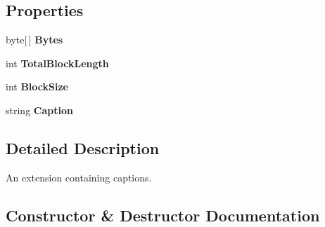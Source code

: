 \subsection*{Properties}
\begin{DoxyCompactItemize}
\item 
byte\mbox{[}$\,$\mbox{]} {\bfseries Bytes}\hypertarget{classvcvj_1_1_models_1_1_grammatical___subcomponents_1_1_plain_text_extension_a2231e7d8faeb082581fceaa43db622b5}{}\label{classvcvj_1_1_models_1_1_grammatical___subcomponents_1_1_plain_text_extension_a2231e7d8faeb082581fceaa43db622b5}

\item 
int {\bfseries Total\+Block\+Length}\hypertarget{classvcvj_1_1_models_1_1_grammatical___subcomponents_1_1_plain_text_extension_aa45cd181ae9b43c515cacef9d5be8230}{}\label{classvcvj_1_1_models_1_1_grammatical___subcomponents_1_1_plain_text_extension_aa45cd181ae9b43c515cacef9d5be8230}

\item 
int {\bfseries Block\+Size}\hypertarget{classvcvj_1_1_models_1_1_grammatical___subcomponents_1_1_plain_text_extension_a3a11ca8960b44f3d1bde3071c8e843c8}{}\label{classvcvj_1_1_models_1_1_grammatical___subcomponents_1_1_plain_text_extension_a3a11ca8960b44f3d1bde3071c8e843c8}

\item 
string {\bfseries Caption}\hypertarget{classvcvj_1_1_models_1_1_grammatical___subcomponents_1_1_plain_text_extension_ab9ac764c21121652f0508daa503c0786}{}\label{classvcvj_1_1_models_1_1_grammatical___subcomponents_1_1_plain_text_extension_ab9ac764c21121652f0508daa503c0786}

\end{DoxyCompactItemize}


\subsection{Detailed Description}
An extension containing captions. 



\subsection{Constructor \& Destructor Documentation}
